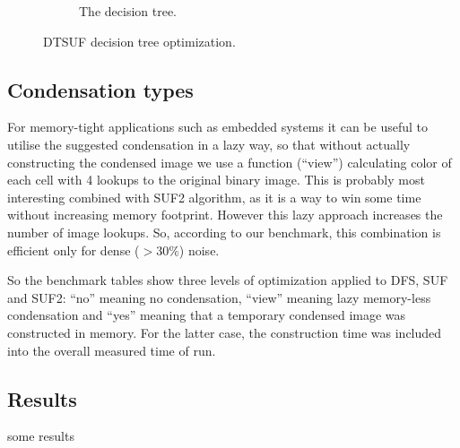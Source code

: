 \documentclass{llncs}
\begin{document}
\begin{figure}
\begin{subfigure}{0.65\linewidth}
    \caption{The decision tree.}
  \end{subfigure}
  \caption{DTSUF decision tree optimization.}
  \label{fig:dtsuf}
\end{figure}

\subsection{Condensation types}

For memory-tight applications such as embedded systems it can be useful to
utilise the suggested condensation in a lazy way, so that without actually
constructing the condensed image we use a function (``view'') calculating color of
each cell with 4 lookups to the original binary image.
This is probably most interesting combined with SUF2 algorithm, as it is a way
to win some time without increasing memory footprint.
However this lazy approach increases the number of image lookups.
So, according to our benchmark, this combination is efficient only for dense
($>30\%$) noise.

So the benchmark tables show three levels of optimization applied to
DFS, SUF and SUF2:
``no'' meaning no condensation, ``view'' meaning lazy memory-less condensation
and ``yes'' meaning that a temporary condensed image was constructed in memory.
For the latter case, the construction time was included into the overall measured
time of run.

\subsection{Results}

some results

\newcommand{\inputtable}[2]{
  \begin{figure}
    \centering
    \texttt{[image: pics/\#1x\#2.eps]}
    \caption{Average CPU time per run on noise images $#1 \times #2$ px}
    \label{fig:noise#1x#2}
  \end{figure}
}
\end{document}
